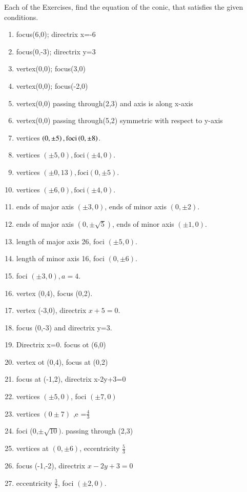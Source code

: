 Each of the Exercises, find the equation of the conic, that satisfies the given conditions.

\begin{enumerate}[label=\thesubsection.\arabic*,ref=\thesubsection.\theenumi,resume*]
\item focus(6,0); directrix x=-6 
\item focus(0,-3); directrix y=3
\item vertex(0,0); focus(3,0)
\item vertex(0,0); focus(-2,0) 
\item vertex(0,0) passing through(2,3) and axis is along x-axis
\item vertex(0,0) passing through(5,2) symmetric with respect to y-axis
\item vertices $\left(0,\pm 5\right), \text{foci} \left(0,\pm 8\right)$.  
\\
\solution
\item vertices $(\pm5,0),\text{foci} (\pm4,0)$.
\item vertices $(\pm0,13),\text{foci} (0,\pm5)$.
\item vertices $(\pm6,0),\text{foci} (\pm4,0)$.
\item ends of major axis $(\pm3,0)$, ends of minor axis $(0,\pm2)$.
\item ends of major axis $(0,\pm \sqrt{5})$, ends of minor axis $(\pm1,0)$.
\item length of major axis 26, foci $(\pm5,0)$.
\item length of minor axis 16, foci $(0,\pm6)$.
\item foci $(\pm3,0),a=4$.
\item vertex (0,4),  focus (0,2). 
\item vertex (-3,0),  directrix $x+5=0$.
\item focus (0,-3) and directrix y=3.
\item  Directrix x=0. focus ot (6,0)
\item  vertex  ot (0,4), focus at (0,2)
\item  focus at (-1,2), directrix x-2y+3=0
	 \item  vertices $(\pm5,0)$, foci $(\pm 7,0)$
	 \item vertices $(0\pm7)$ ,e =$\frac{4}{3}$ 
	 \item  foci (0,$\pm\sqrt{10})$. passing through (2,3)
\item vertices at $(0,\pm6)$,  eccentricity $\frac{5}{3}$
\item focus (-1,-2),  directrix $x-2y+3=0$ 
\item eccentricity $\frac{3}{2}$, foci $(\pm2,0)$.

\end{enumerate}
